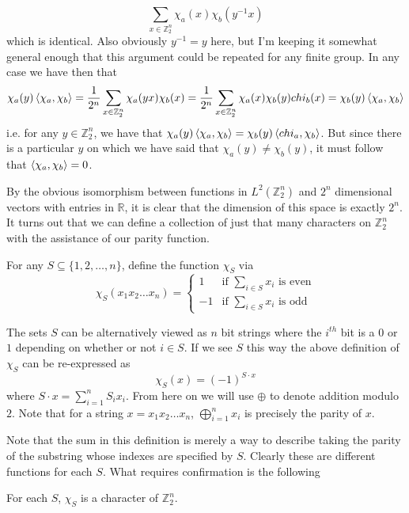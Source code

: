 \[ \sum_{x \in \mathbb{Z}_2^n} \chi_a(x)\chi_b(y^{-1}x) \]
which is identical. Also obviously $y^{-1} = y$ here, but I'm keeping it somewhat general enough that this argument could be repeated for any finite group. In any case we have then that 
\[ \chi_a(y)\braket{\chi_a,\chi_b} = \frac{1}{2^n}\sum_{x \in \mathbb{Z}_2^n} \chi_a(yx)\chi_b(x) = \frac{1}{2^n}\sum_{x \in \mathbb{Z}_2^n} \chi_a(x)\chi_b(y)chi_b(x) = \chi_b(y)\braket{\chi_a,\chi_b} \]
i.e. for any $y \in \mathbb{Z}_2^n$, we have that $\chi_a(y)\braket{\chi_a,\chi_b} = \chi_b(y)\braket{chi_a,\chi_b}$. But since there is a particular $y$ on which we have said that $\chi_a(y) \neq \chi_b(y)$, it must follow that $\braket{\chi_a,\chi_b} = 0$. \par 
By the obvious isomorphism between functions in $L^2(\mathbb{Z}_2^n)$ and $2^n$ dimensional vectors with entries in $\mathbb{R}$, it is clear that the dimension of this space is exactly $2^n$. It turns out that we can define a collection of just that many characters on $\mathbb{Z}_2^n$ with the assistance of our parity function. 
\begin{definition}
	For any $S \subseteq \{1,2,\ldots,n\}$, define the function $\chi_S$ via 
	\[ \chi_S(x_1x_2\ldots x_n) = \begin{cases} 1 & \textrm{if } \sum_{i \in S} x_i \textrm{ is even} \\
	-1 & \textrm{if } \sum_{i \in S} x_i \textrm{ is odd} \end{cases}
	 \]
	
\end{definition}
The sets $S$ can be alternatively viewed as $n$ bit strings where the $i^{th}$ bit is a $0$ or $1$ depending on whether or not $i \in S$. If we see $S$ this way the above definition of $\chi_S$ can be re-expressed as 
\[ \chi_S(x) = (-1)^{S \cdot x} \]
where $S \cdot x = \sum_{i=1}^n S_i x_i$.  
From here on we will use $\oplus$ to denote addition modulo $2$. Note that for a string $x = x_1x_2\ldots x_n$, $\bigoplus_{i=1}^n x_i$ is precisely the parity of $x$. \par 
Note that the sum in this definition is merely a way to describe taking the parity of the substring whose indexes are specified by $S$. Clearly these are different functions for each $S$. What requires confirmation is the following
\begin{fact}
	For each $S$, $\chi_S$ is a character of $\mathbb{Z}_2^n$.
\end{fact}
